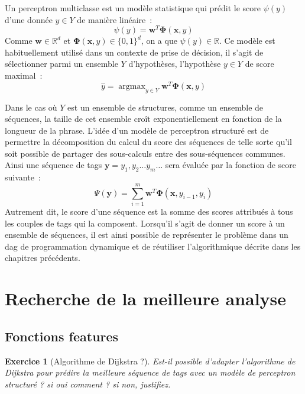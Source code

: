 \documentclass[11pt,openany]{book}
\newtheorem{exo}{Exercice}[chapter]
\newcommand{\ac}[1]{{\sc #1}} %
\begin{document}
Un perceptron multiclasse est un modèle statistique qui prédit le
score $\psi(y)$ d'une donnée $y\in Y$ de manière linéaire~:
\begin{equation}
\psi(y) = \mathbf{w}^T \boldsymbol\Phi(\mathbf{x},y)
\end{equation}
Comme $\mathbf{w} \in \mathbb{R}^d$ et $\boldsymbol\Phi(\mathbf{x},y)
\in \{0,1\}^d$, on a que $\psi(y) \in \mathbb{R}$. 
Ce modèle est habituellement utilisé dans un contexte de prise de
décision, il s'agit de sélectionner parmi un ensemble $Y$ d'hypothèses, 
l'hypothèse $y\in Y$ de score maximal~:
\begin{equation}
\hat{y} =   \mathop{\text{argmax}}_{y\in Y} \mathbf{w}^T \boldsymbol\Phi(\mathbf{x},y)
\end{equation}

Dans le cas où $Y$ est un ensemble de structures, comme un ensemble de
séquences, la taille de cet ensemble croît exponentiellement en
fonction de la longueur de la phrase. 
L'idée d'un modèle de perceptron structuré est de permettre la
décomposition du calcul du score des séquences de telle sorte qu'il
soit possible de partager des sous-calculs entre des sous-séquences communes.
Ainsi une séquence de tags $\mathbf{y} = y_1,y_2\ldots y_m\ldots $
sera évaluée par la fonction de score suivante~:
\begin{equation}
\Psi(\mathbf{y}) = \sum_{i=1}^m \mathbf{w}^T \boldsymbol\Phi(\mathbf{x},y_{i-1},y_i)
\end{equation}
Autrement dit, le score d'une séquence est la somme des scores
attribués à tous les couples de tags qui la composent. Lorsqu'il
s'agit de donner un score à un ensemble de séquences, il est ainsi
possible de représenter le problème dans un \ac{dag} de programmation
dynamique et de réutiliser l'algorithmique décrite dans les chapitres précédents.


\section{Recherche de la meilleure analyse}

\subsection{Fonctions features}


\begin{exo}[Algorithme de Dijkstra ?]
Est-il possible d'adapter l'algorithme de Dijkstra pour prédire la
meilleure séquence de tags avec un modèle de perceptron structuré ?
si oui comment ? si non, justifiez.
\end{exo}
\end{document}
